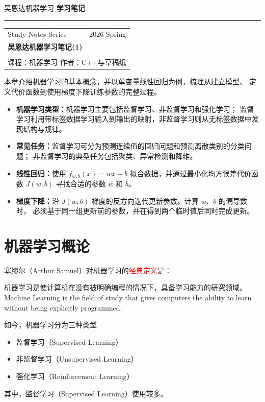 \documentclass[12pt,a4paper]{ctexart}
\newcommand{\topbar}[2]{
  \noindent
  {\small\textcolor{MainColor}{#1}}
  \hfill
  {\small\bfseries\textcolor{TitleDark}{#2}}
  \par\vspace{0.35em}
  {\color{BorderGray}\hrule}
  \vspace{1.2em}
}
\newcommand{\notetitlecard}[6]{
\begin{tcolorbox}[
  enhanced,
  colback=white,
  colframe=BorderGray,
  boxrule=0.6pt,
  arc=2mm,
  left=12pt,
  right=12pt,
  top=10pt,
  bottom=10pt,
  borderline west={4pt}{0pt}{SecondColor}
]
\begin{tabularx}{\linewidth}{X r}
{\small\textcolor{TextGray}{#1}} & {\small\textcolor{TextGray}{#2}} \\[0.9em]
\multicolumn{2}{l}{
  {\Huge\bfseries\textcolor{MainColor}{#3}}
} \\[0.45em]
\multicolumn{2}{l}{
  {\large\textcolor{SecondColor!90!black}{#4}}
} \\[0.45em]
\multicolumn{2}{l}{
  {\small\textcolor{TextGray}{课程：#5 \qquad 作者：#6}}
}
\end{tabularx}
\end{tcolorbox}
\vspace{1em}
}
\begin{document}
\topbar{吴恩达机器学习}{学习笔记}

\notetitlecard
  {Study Notes Series}
  {2026 Spring}
  {吴恩达机器学习笔记(1)}
  {}
  {机器学习}
  {C++与草稿纸}

\begin{summarybox}
本章介绍机器学习的基本概念，并以单变量线性回归为例，梳理从建立模型、
定义代价函数到使用梯度下降训练参数的完整过程。
\begin{itemize}[leftmargin=2em, itemsep=2pt, topsep=4pt]
  \item \textbf{机器学习类型：}机器学习主要包括监督学习、非监督学习和强化学习；
  监督学习利用带标签数据学习输入到输出的映射，非监督学习则从无标签数据中发现结构与规律。
  \item \textbf{常见任务：}监督学习可分为预测连续值的回归问题和预测离散类别的分类问题；
  非监督学习的典型任务包括聚类、异常检测和降维。
  \item \textbf{线性回归：}使用 $f_{w,b}(x)=wx+b$ 拟合数据，并通过最小化均方误差代价函数
  $J(w,b)$ 寻找合适的参数 $w$ 和 $b$。
  \item \textbf{梯度下降：}沿 $J(w,b)$ 梯度的反方向迭代更新参数。计算 $w$、$b$ 的偏导数时，
  必须基于同一组更新前的参数，并在得到两个临时值后同时完成更新。
\end{itemize}
\end{summarybox}

\section{机器学习概论}

\begin{definitionbox}[机器学习的定义]
塞缪尔（Arthur Samuel）对机器学习的\textcolor{red}{经典定义}是：

机器学习是使计算机在没有被明确编程的情况下，具备学习能力的研究领域。
\\
Machine Learning is the field of study
that gives computers the ability to learn
without being explicitly programmed.
\end{definitionbox}

\begin{keybox}[机器学习的类型]
如今，机器学习分为三种类型
\begin{itemize}
    \item 监督学习（Supervised Learning）
    \item 非监督学习（Unsupervised Learning）
    \item 强化学习（Reinforcement Learning）
\end{itemize}
其中，监督学习（Supervised Learning）使用较多。
\end{keybox}
\end{document}

